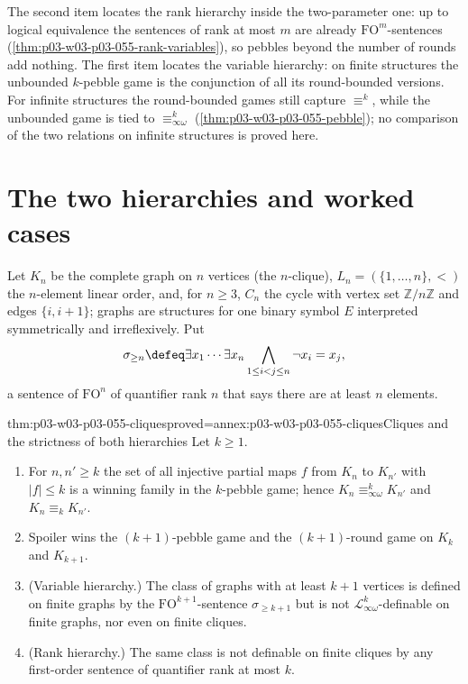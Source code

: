 The second item locates the rank hierarchy inside the two-parameter one: up
to logical equivalence the sentences of rank at most \(m\) are already
\(\mathrm{FO}^m\)-sentences (\cref{thm:p03-w03-p03-055-rank-variables}), so
pebbles beyond the number of rounds add nothing. The first item locates the
variable hierarchy: on finite structures the unbounded \(k\)-pebble game is
the conjunction of all its round-bounded versions. For infinite structures
the round-bounded games still capture \(\equiv^k\), while the unbounded game
is tied to \(\equiv^k_{\infty\omega}\) (\cref{thm:p03-w03-p03-055-pebble});
no comparison of the two relations on infinite structures is proved here.

\section{The two hierarchies and worked cases}
\label{sec:p03-w03-p03-055-hierarchies}

Let \(K_n\) be the complete graph on \(n\) vertices (the \(n\)-clique),
\(L_n=(\{1,\ldots,n\},<)\) the \(n\)-element linear order, and, for
\(n\ge3\), \(C_n\) the cycle with vertex set \(\mathbb Z/n\mathbb Z\) and
edges \(\{i,i+1\}\); graphs are structures for one binary symbol \(E\)
interpreted symmetrically and irreflexively. Put
\[
 \sigma_{\ge n}\defeq\exists x_1\cdots\exists x_n
 \bigwedge_{1\le i<j\le n}\neg x_i=x_j ,
\]
a sentence of \(\mathrm{FO}^n\) of quantifier rank \(n\) that says there are
at least \(n\) elements.

\begin{hbtheorem}{thm:p03-w03-p03-055-cliques}{proved=annex:p03-w03-p03-055-cliques}{Cliques and the strictness of both hierarchies}
Let \(k\ge1\).
\begin{enumerate}
\item For \(n,n'\ge k\) the set of all injective partial maps
      \(f\) from \(K_n\) to \(K_{n'}\) with \(|f|\le k\) is a winning family
      in the \(k\)-pebble game; hence
      \(K_n\equiv^k_{\infty\omega}K_{n'}\) and \(K_n\equiv_kK_{n'}\).
\item Spoiler wins the \((k+1)\)-pebble game and the \((k+1)\)-round game
      on \(K_k\) and \(K_{k+1}\).
\item (Variable hierarchy.) The class of graphs with at least \(k+1\)
      vertices is defined on finite graphs by the \(\mathrm{FO}^{k+1}\)-sentence
      \(\sigma_{\ge k+1}\) but is not \(\mathcal L^k_{\infty\omega}\)-definable
      on finite graphs, nor even on finite cliques.
\item (Rank hierarchy.) The same class is not definable on finite cliques
      by any first-order sentence of quantifier rank at most \(k\).
\end{enumerate}
\end{hbtheorem}

